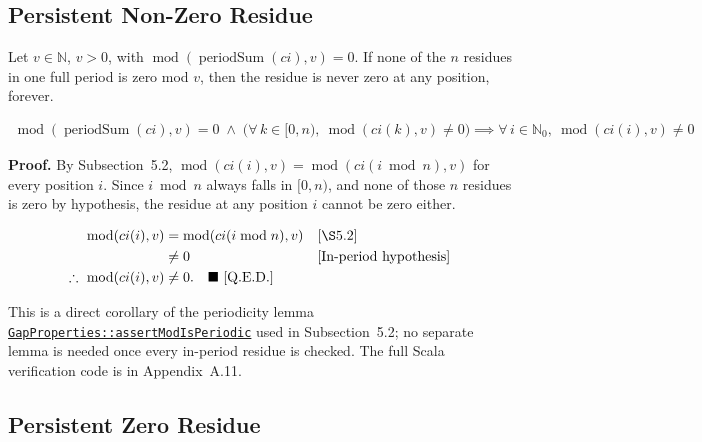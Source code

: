 \subsection{Persistent Non-Zero Residue}

Let $v \in \mathbb{N}$, $v > 0$, with
$\operatorname{mod}(\operatorname{periodSum}(ci), v) = 0$. If none of the
$n$ residues in one full period is zero mod $v$, then the residue is never
zero at any position, forever.

\begin{equation*}
\begin{aligned}
\operatorname{mod}(\operatorname{periodSum}(ci), v) = 0 \;\land\; \big(\forall\, k \in [0, n),\ \operatorname{mod}(ci(k), v) \neq 0\big)
\implies \forall\, i \in \mathbb{N}_0,\ \operatorname{mod}(ci(i), v) \neq 0
\end{aligned}
\end{equation*}

\textbf{Proof.} By Subsection~5.2, $\operatorname{mod}(ci(i), v)
= \operatorname{mod}(ci(i \bmod n), v)$ for every position $i$. Since
$i \bmod n$ always falls in $[0, n)$, and none of those $n$ residues is zero
by hypothesis, the residue at any position $i$ cannot be zero either.

\begin{equation*}
\begin{aligned}
\operatorname{mod}(ci(i),v) &= \operatorname{mod}(ci(i \bmod n),v) &&\text{[\S5.2]} \\
                      &\neq 0 &&\text{[In-period hypothesis]} \\
\therefore\ \operatorname{mod}(ci(i),v) &\neq 0.
  \quad \blacksquare\ \text{[Q.E.D.]}
\end{aligned}
\end{equation*}

{\raggedright
This is a direct corollary of the periodicity lemma
\href{https://github.com/thiagomata/prime-numbers/blob/integral-cycle-article-v1.0.0/src/main/scala/v1/chapter4/cycle/integral/recursive/properties/GapProperties.scala}{\texttt{GapProperties::\allowbreak assertModIsPeriodic}}
used in Subsection~5.2; no separate lemma is needed once every in-period
residue is checked. The full Scala verification code is in Appendix~A.11.
\par}

\subsection{Persistent Zero Residue}

